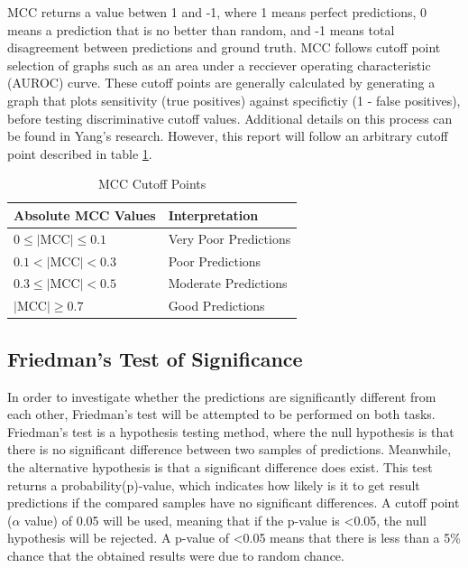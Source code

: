 \documentclass[10.7pt, onecolumn]{article}
\begin{document}
MCC returns a value betwen 1 and -1, where 1 means perfect predictions, 0 means a prediction that is no better than random, and -1 means total disagreement between predictions and ground truth. MCC follows cutoff point selection of graphs such as an area under a recciever operating characteristic (AUROC) curve\cite{articlesss}. These cutoff points are generally calculated by generating a graph that plots sensitivity (true positives) against specifictiy (1 - false positives), before testing discriminative cutoff values. Additional details on this process can be found in Yang's research\cite{Yang_Berdine_2017}. However, this report will follow an arbitrary cutoff point described in table \ref{tab:mccInterpretation}.

\begin{table}[H]
  \centering
  \begin{tabular}{|p{4cm}|p{3cm}|}
    \hline
    \textbf{Absolute MCC Values} & \textbf{Interpretation} \\
    \hline
    $0 \leq |\text{MCC}| \leq 0.1$ & Very Poor Predictions \\
    \hline
    $0.1 < |\text{MCC}| < 0.3$ & Poor Predictions \\
    \hline
    $0.3 \leq |\text{MCC}| < 0.5$ & Moderate Predictions \\
    \hline
    $|\text{MCC}| \geq 0.7$ & Good Predictions \\
    \hline
  \end{tabular}
  \caption{MCC Cutoff Points}
  \label{tab:mccInterpretation}
\end{table}

\subsection{Friedman's Test of Significance}
In order to investigate whether the predictions are significantly different from each other, Friedman's test will be attempted to be performed on both tasks. Friedman's test is a hypothesis testing method, where the null hypothesis is that there is no significant difference between two samples of predictions\cite{HOFFMAN2015421}. Meanwhile, the alternative hypothesis is that a significant difference does exist. This test returns a probability(p)-value, which indicates how likely is it to get result predictions if the compared samples have no significant differences. A cutoff point ($\alpha$ value) of 0.05 will be used, meaning that if the p-value is <0.05, the null hypothesis will be rejected. A p-value of <0.05 means that there is less than a 5\% chance that the obtained results were due to random chance.
\end{document}
